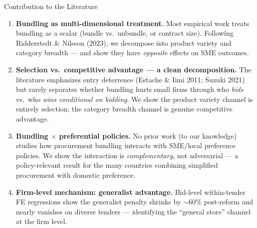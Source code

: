 \documentclass[9pt,aspectratio=169]{beamer}
\begin{document}
\begin{frame}{Contribution to the Literature}
\begin{enumerate}
  \item \textbf{Bundling as multi-dimensional treatment.}
        Most empirical work treats bundling as a scalar (bundle vs.\ unbundle, or contract size).
        Following Ridderstedt \& Nilsson (2023), we decompose into product variety and category breadth
        --- and show they have \textit{opposite} effects on SME outcomes.

  \bigskip
  \item \textbf{Selection vs.\ competitive advantage --- a clean decomposition.}
        The literature emphasizes entry deterrence (Estache \& Iimi 2011; Suzuki 2021)
        but rarely separates whether bundling hurts small firms through who \textit{bids}
        vs.\ who \textit{wins conditional on bidding}. We show the product variety channel
        is entirely selection; the category breadth channel is genuine competitive advantage.

  \bigskip
  \item \textbf{Bundling $\times$ preferential policies.}
        No prior work (to our knowledge) studies how procurement bundling interacts with
        SME/local preference policies. We show the interaction is \textit{complementary},
        not adversarial --- a policy-relevant result for the many countries combining
        simplified procurement with domestic preference.

  \bigskip
  \item \textbf{Firm-level mechanism: generalist advantage.}
        Bid-level within-tender FE regressions show the generalist penalty shrinks
        by $\sim$60\% post-reform and nearly vanishes on diverse tenders ---
        identifying the ``general store'' channel at the firm level.
\end{enumerate}
\end{frame}

\appendix
\end{document}
